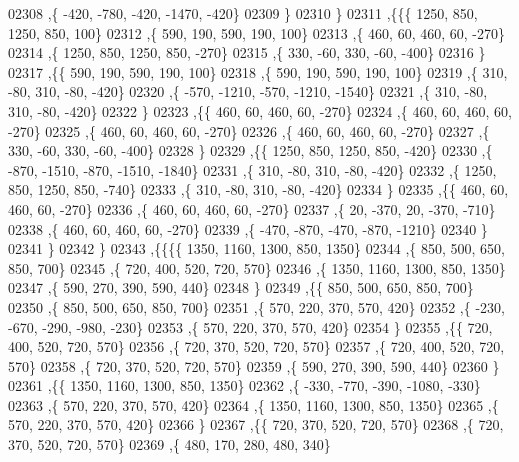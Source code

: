 \begin{DoxyCode}
02308     ,\{  -420,  -780,  -420, -1470,  -420\}
02309     \}
02310    \}
02311   ,\{\{\{  1250,   850,  1250,   850,   100\}
02312     ,\{   590,   190,   590,   190,   100\}
02313     ,\{   460,    60,   460,    60,  -270\}
02314     ,\{  1250,   850,  1250,   850,  -270\}
02315     ,\{   330,   -60,   330,   -60,  -400\}
02316     \}
02317    ,\{\{   590,   190,   590,   190,   100\}
02318     ,\{   590,   190,   590,   190,   100\}
02319     ,\{   310,   -80,   310,   -80,  -420\}
02320     ,\{  -570, -1210,  -570, -1210, -1540\}
02321     ,\{   310,   -80,   310,   -80,  -420\}
02322     \}
02323    ,\{\{   460,    60,   460,    60,  -270\}
02324     ,\{   460,    60,   460,    60,  -270\}
02325     ,\{   460,    60,   460,    60,  -270\}
02326     ,\{   460,    60,   460,    60,  -270\}
02327     ,\{   330,   -60,   330,   -60,  -400\}
02328     \}
02329    ,\{\{  1250,   850,  1250,   850,  -420\}
02330     ,\{  -870, -1510,  -870, -1510, -1840\}
02331     ,\{   310,   -80,   310,   -80,  -420\}
02332     ,\{  1250,   850,  1250,   850,  -740\}
02333     ,\{   310,   -80,   310,   -80,  -420\}
02334     \}
02335    ,\{\{   460,    60,   460,    60,  -270\}
02336     ,\{   460,    60,   460,    60,  -270\}
02337     ,\{    20,  -370,    20,  -370,  -710\}
02338     ,\{   460,    60,   460,    60,  -270\}
02339     ,\{  -470,  -870,  -470,  -870, -1210\}
02340     \}
02341    \}
02342   \}
02343  ,\{\{\{\{  1350,  1160,  1300,   850,  1350\}
02344     ,\{   850,   500,   650,   850,   700\}
02345     ,\{   720,   400,   520,   720,   570\}
02346     ,\{  1350,  1160,  1300,   850,  1350\}
02347     ,\{   590,   270,   390,   590,   440\}
02348     \}
02349    ,\{\{   850,   500,   650,   850,   700\}
02350     ,\{   850,   500,   650,   850,   700\}
02351     ,\{   570,   220,   370,   570,   420\}
02352     ,\{  -230,  -670,  -290,  -980,  -230\}
02353     ,\{   570,   220,   370,   570,   420\}
02354     \}
02355    ,\{\{   720,   400,   520,   720,   570\}
02356     ,\{   720,   370,   520,   720,   570\}
02357     ,\{   720,   400,   520,   720,   570\}
02358     ,\{   720,   370,   520,   720,   570\}
02359     ,\{   590,   270,   390,   590,   440\}
02360     \}
02361    ,\{\{  1350,  1160,  1300,   850,  1350\}
02362     ,\{  -330,  -770,  -390, -1080,  -330\}
02363     ,\{   570,   220,   370,   570,   420\}
02364     ,\{  1350,  1160,  1300,   850,  1350\}
02365     ,\{   570,   220,   370,   570,   420\}
02366     \}
02367    ,\{\{   720,   370,   520,   720,   570\}
02368     ,\{   720,   370,   520,   720,   570\}
02369     ,\{   480,   170,   280,   480,   340\}

\end{DoxyCode}

